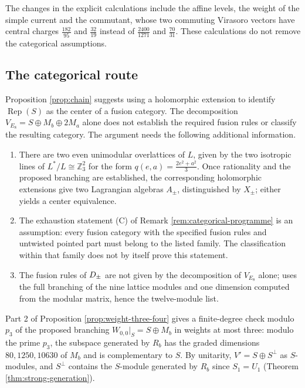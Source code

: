 \documentclass[leqno]{article}
\let\cal\relax
\newcommand{\cal}{\mathcal}
\newcommand{\Z}{\ensuremath{\mathbb{Z}}}
\DeclareMathOperator{\Rep}{Rep}
\numberwithin{equation}{section}
\begin{document}
The changes in the explicit calculations include the affine levels, the weight of the simple current and the commutant, whose two commuting Virasoro vectors have central charges $\frac{182}{95}$ and $\frac{32}{19}$ instead of $\frac{2400}{1271}$ and $\frac{70}{31}$. These calculations do not remove the categorical assumptions.

\subsection{The categorical route}
\label{subsec:categorical-route}

Proposition \ref{prop:chain} suggests using a holomorphic extension to identify $\Rep(S)$ as the center of a fusion category. The decomposition $V_{E_8} = S \oplus M_b \oplus 2M_a$ alone does not establish the required fusion rules or classify the resulting category. The argument needs the following additional information.
\begin{enumerate}
\item There are two even unimodular overlattices of $L$, given by the two isotropic lines of $L^*/L \cong \Z_3^2$ for the form $q(e,a) = \frac{2e^2+a^2}{3}$. Once rationality and the proposed branching are established, the corresponding holomorphic extensions give two Lagrangian algebras $A_\pm$, distinguished by $X_\pm$; either yields a center equivalence.
\item The exhaustion statement (C) of Remark \ref{rem:categorical-programme} is an assumption: every fusion category with the specified fusion rules and untwisted pointed part must belong to the listed family. The classification within that family \cite{EvG17} does not by itself prove this statement.
\item The fusion rules of $\cal D_\pm$ are not given by the decomposition of $V_{E_8}$ alone; \cite[Section 12]{Rie26b} uses the full branching of the nine lattice modules and one dimension computed from the modular matrix, hence the twelve-module list.
\end{enumerate}
Part 2 of Proposition \ref{prop:weight-three-four} gives a finite-degree check modulo $p_3$ of the proposed branching $W_{0,0}|_S = S \oplus M_b$ in weights at most three: modulo the prime $p_3$, the subspace generated by $R_b$ has the graded dimensions $80, 1250, 10630$ of $M_b$ and is complementary to $S$. By unitarity, $V' = S \oplus S^\perp$ as $S$-modules, and $S^\perp$ contains the $S$-module generated by $R_b$ since $S_1 = U_1$ (Theorem \ref{thm:strong-generation}).
\end{document}
